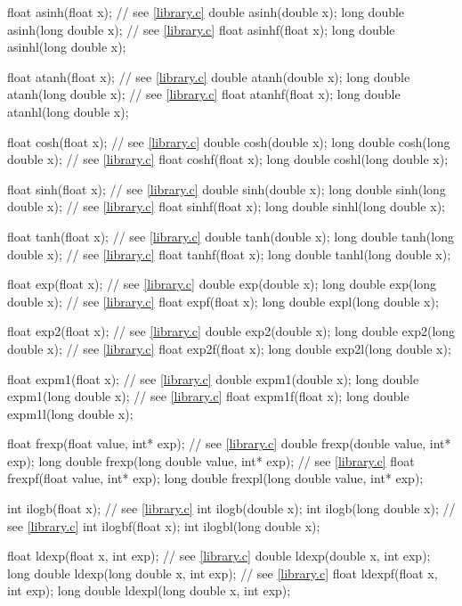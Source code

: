 \begin{codeblock}
{  float asinh(float x);  // see \ref{library.c}
  double asinh(double x);
  long double asinh(long double x);  // see \ref{library.c}
  float asinhf(float x);
  long double asinhl(long double x);

  float atanh(float x);  // see \ref{library.c}
  double atanh(double x);
  long double atanh(long double x);  // see \ref{library.c}
  float atanhf(float x);
  long double atanhl(long double x);

  float cosh(float x);  // see \ref{library.c}
  double cosh(double x);
  long double cosh(long double x);  // see \ref{library.c}
  float coshf(float x);
  long double coshl(long double x);

  float sinh(float x);  // see \ref{library.c}
  double sinh(double x);
  long double sinh(long double x);  // see \ref{library.c}
  float sinhf(float x);
  long double sinhl(long double x);

  float tanh(float x);  // see \ref{library.c}
  double tanh(double x);
  long double tanh(long double x);  // see \ref{library.c}
  float tanhf(float x);
  long double tanhl(long double x);

  float exp(float x);  // see \ref{library.c}
  double exp(double x);
  long double exp(long double x);  // see \ref{library.c}
  float expf(float x);
  long double expl(long double x);

  float exp2(float x);  // see \ref{library.c}
  double exp2(double x);
  long double exp2(long double x);  // see \ref{library.c}
  float exp2f(float x);
  long double exp2l(long double x);

  float expm1(float x);  // see \ref{library.c}
  double expm1(double x);
  long double expm1(long double x);  // see \ref{library.c}
  float expm1f(float x);
  long double expm1l(long double x);

  float frexp(float value, int* exp);  // see \ref{library.c}
  double frexp(double value, int* exp);
  long double frexp(long double value, int* exp);  // see \ref{library.c}
  float frexpf(float value, int* exp);
  long double frexpl(long double value, int* exp);

  int ilogb(float x);  // see \ref{library.c}
  int ilogb(double x);
  int ilogb(long double x);  // see \ref{library.c}
  int ilogbf(float x);
  int ilogbl(long double x);

  float ldexp(float x, int exp);  // see \ref{library.c}
  double ldexp(double x, int exp);
  long double ldexp(long double x, int exp);  // see \ref{library.c}
  float ldexpf(float x, int exp);
  long double ldexpl(long double x, int exp);

}
\end{codeblock}
